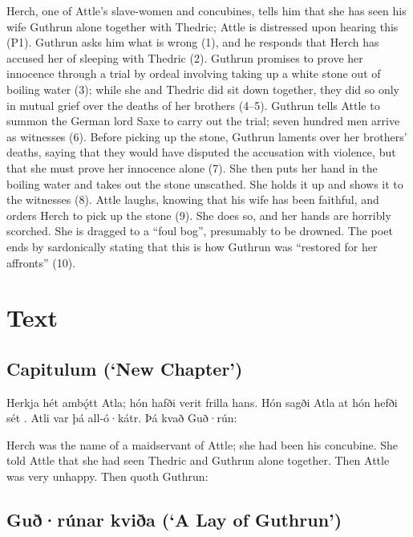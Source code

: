 Herch, one of Attle’s slave-women and concubines, tells him that she has seen his wife Guthrun alone together with Thedric; Attle is distressed upon hearing this (P1).  Guthrun asks him what is wrong (1), and he responds that Herch has accused her of sleeping with Thedric (2).  Guthrun promises to prove her innocence through a trial by ordeal involving taking up a white stone out of boiling water (3); while she and Thedric did sit down together, they did so only in mutual grief over the deaths of her brothers (4--5).  Guthrun tells Attle to summon the German lord Saxe to carry out the trial; seven hundred men arrive as witnesses (6). Before picking up the stone, Guthrun laments over her brothers’ deaths, saying that they would have disputed the accusation with violence, but that she must prove her innocence alone (7).  She then puts her hand in the boiling water and takes out the stone unscathed.  She holds it up and shows it to the witnesses (8).  Attle laughs, knowing that his wife has been faithful, and orders Herch to pick up the stone (9).  She does so, and her hands are horribly scorched.  She is dragged to a “foul bog”, presumably to be drowned.  The poet ends by sardonically stating that this is how Guthrun was “restored for her affronts” (10).

\newpage

\section{Text}

\subsection{Capitulum (‘New Chapter’)}

\bpg\bpa%
Herkja hét ambǫ́tt Atla; hón hafði verit frilla hans. Hón sagði Atla at hón hefði sét . Atli var þá all-ó·kátr. Þá kvað Guð·rún:\epa

\bpb%
Herch was the name of a maidservant of Attle; she had been his concubine.  She told Attle that she had seen Thedric and Guthrun alone together.  Then Attle was very unhappy.  Then quoth Guthrun:\epb\epg

\subsection{Guð·rúnar kviða (‘A Lay of Guthrun’)}

